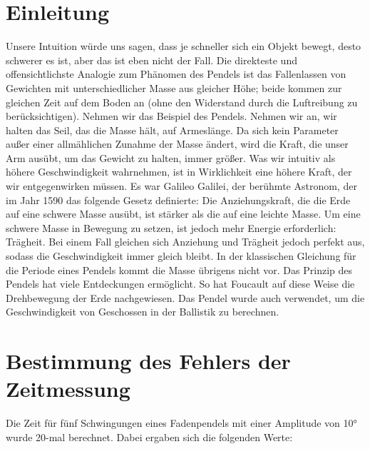 \documentclass[12pt, a4paper, twoside]{article}
\begin{document}
    

    \section{Einleitung}
    Unsere Intuition würde uns sagen, dass je schneller sich ein Objekt bewegt, desto schwerer es ist, aber das ist eben nicht der Fall.
    Die direkteste und offensichtlichste Analogie zum Phänomen des Pendels ist das Fallenlassen von Gewichten mit unterschiedlicher Masse
    aus gleicher Höhe; beide kommen zur gleichen Zeit auf dem Boden an (ohne den Widerstand durch die Luftreibung zu berücksichtigen). Nehmen
    wir das Beispiel des Pendels. Nehmen wir an, wir halten das Seil, das die Masse hält, auf Armeslänge. Da sich kein Parameter außer einer
    allmählichen Zunahme der Masse ändert, wird die Kraft, die unser Arm ausübt, um das Gewicht zu halten, immer größer.  Was wir intuitiv als
    höhere Geschwindigkeit wahrnehmen, ist in Wirklichkeit eine höhere Kraft, der wir entgegenwirken müssen. Es war Galileo Galilei, der berühmte
    Astronom, der im Jahr 1590 das folgende Gesetz definierte: Die Anziehungskraft, die die Erde auf eine schwere Masse ausübt, ist stärker als die
    auf eine leichte Masse. Um eine schwere Masse in Bewegung zu setzen, ist jedoch mehr Energie erforderlich: Trägheit. Bei einem Fall gleichen
    sich Anziehung und Trägheit jedoch perfekt aus, sodass die Geschwindigkeit immer gleich bleibt. In der klassischen Gleichung für die Periode
    eines Pendels kommt die Masse übrigens nicht vor. Das Prinzip des Pendels hat viele Entdeckungen ermöglicht. So hat Foucault auf diese Weise
    die Drehbewegung der Erde nachgewiesen. Das Pendel wurde auch verwendet, um die Geschwindigkeit von Geschossen in der Ballistik zu berechnen.
    \vfill
    \section{Bestimmung des Fehlers der Zeitmessung}
    Die Zeit für fünf Schwingungen eines Fadenpendels mit einer Amplitude von 10° wurde 20-mal berechnet. Dabei ergaben sich die folgenden Werte:
    \\
    
\end{document}
